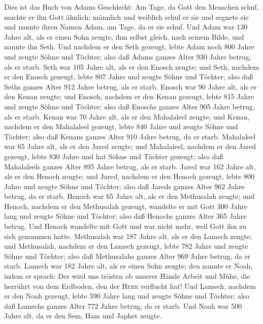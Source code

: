  Dies ist das Buch von Adams Geschlecht: Am Tage, da Gott
den Menschen schuf, machte er ihn Gott ähnlich;  männlich
und weiblich schuf er sie und segnete sie und nannte ihren Namen Adam,
am Tage, da er sie schuf.  Und Adam war 130 Jahre alt, als
er einen Sohn zeugte, ihm selbst gleich, nach seinem Bilde, und nannte
ihn Seth.  Und nachdem er den Seth gezeugt, lebte Adam
noch 800 Jahre und zeugte Söhne und Töchter;  also daß
Adams ganzes Alter 930 Jahre betrug, als er starb.  Seth
war 105 Jahre alt, als er den Enosch zeugte;  und Seth,
nachdem er den Enosch gezeugt, lebte 807 Jahre und zeugte Söhne und
Töchter;  also daß Seths ganzes Alter 912 Jahre betrug,
als er starb.  Enosch war 90 Jahre alt, als er den Kenan
zeugte;  und Enosch, nachdem er den Kenan gezeugt, lebte
815 Jahre und zeugte Söhne und Töchter;  also daß Enoschs
ganzes Alter 905 Jahre betrug, als er starb.  Kenan war
70 Jahre alt, als er den Mahalaleel zeugte;  und Kenan,
nachdem er den Mahalaleel gezeugt, lebte 840 Jahre und zeugte Söhne und
Töchter;  also daß Kenans ganzes Alter 910 Jahre betrug,
da er starb.  Mahalaleel war 65 Jahre alt, als er den
Jared zeugte;  und Mahalaleel, nachdem er den Jared
gezeugt, lebte 830 Jahre und hat Söhne und Töchter gezeugt;
 also daß Mahalaleels ganzes Alter 895 Jahre betrug, als
er starb.  Jared war 162 Jahre alt, als er den Henoch
zeugte;  und Jared, nachdem er den Henoch gezeugt, lebte
800 Jahre und zeugte Söhne und Töchter;  also daß Jareds
ganzes Alter 962 Jahre betrug, da er starb.  Henoch war
65 Jahre alt, als er den Methusalah zeugte;  und Henoch,
nachdem er den Methusalah gezeugt, wandelte er mit Gott 300 Jahre lang
und zeugte Söhne und Töchter;  also daß Henochs ganzes
Alter 365 Jahre betrug.  Und Henoch wandelte mit Gott und
war nicht mehr, weil Gott ihn zu sich genommen hatte. 
Methusalah war 187 Jahre alt, als er den Lamech zeugte; 
und Methusalah, nachdem er den Lamech gezeugt, lebte 782 Jahre und
zeugte Söhne und Töchter;  also daß Methusalahs ganzes
Alter 969 Jahre betrug, da er starb.  Lamech war 182
Jahre alt, als er einen Sohn zeugte;  den nannte er Noah,
indem er sprach: Der wird uns trösten ob unserer Hände Arbeit und Mühe,
die herrührt von dem Erdboden, den der \textsc{Herr} verflucht hat!
 Und Lamech, nachdem er den Noah gezeugt, lebte 590 Jahre
lang und zeugte Söhne und Töchter;  also daß Lamechs
ganzes Alter 772 Jahre betrug, da er starb.  Und Noah war
500 Jahre alt, da er den Sem, Ham und Japhet zeugte.


